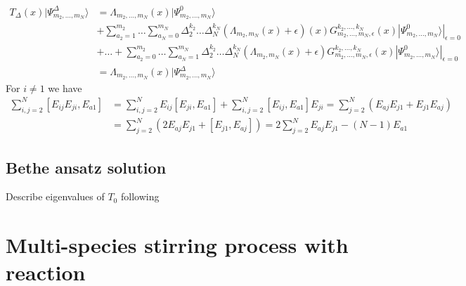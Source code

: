 \documentclass[11pt]{article}
\numberwithin{equation}{section}
\numberwithin{equation}{subsection}
\begin{document}
{\begin{align*}
T_{\Delta}(x)|\Psi_{m_{2},\ldots,m_{N}}^{\Delta}\rangle&=
		\Lambda_{m_{2},\ldots,m_{N}}(x)|\Psi_{m_{2},\ldots,m_{N}}^{0}\rangle
	\\&+
	\sum_{a_{2}=1}^{m_{2}}\ldots\sum_{a_{N}=0}^{m_{N}}\Delta_{2}^{k_{2}}\ldots \Delta_{N}^{k_{N}}\left(\Lambda_{m_{2},m_{N}}(x)+\epsilon\right)(x)G_{m_{2},\ldots,m_{N},\epsilon}^{k_{2},\ldots,k_{N}}(x)|\Psi_{m_{2},\ldots,m_{N}}^{0}\rangle|_{\epsilon=0}
	\\&+\ldots+	\sum_{a_{2}=0}^{m_{2}}\ldots\sum_{a_{N}=1}^{m_{N}}\Delta_{2}^{k_{2}}\ldots \Delta_{N}^{k_{N}}\left(\Lambda_{m_{2},m_{N}}(x)+\epsilon\right)G_{m_{2},\ldots,m_{N},\epsilon}^{k_{2},\ldots,k_{N}}(x)|\Psi_{m_{2},\ldots,m_{N}}^{0}\rangle|_{\epsilon=0}
	\\&=
	\Lambda_{m_{2},\ldots,m_{N}}(x)|\Psi_{m_{2},\ldots,m_{N}}^{\Delta}\rangle
\end{align*}
}
For $i\neq 1$ we have
\begin{equation}
\begin{split}
 \sum_{i,j=2}^N [E_{ij}E_{ji},E_{a1}]&=\sum_{i,j=2}^N E_{ij} [E_{ji},E_{a1}]+\sum_{i,j=2}^N  [E_{ij},E_{a1}]E_{ji}=\sum_{j=2}^N( E_{aj} E_{j1}+ E_{j1} E_{aj})
\\&=\sum_{j=2}^N( 2E_{aj} E_{j1}+ [E_{j1}, E_{aj}])=2\sum_{j=2}^N E_{aj} E_{j1}-(N-1)E_{a1}
 \end{split}
\end{equation} 

\subsection{Bethe ansatz solution}

Describe eigenvalues of $T_0$ following 
\cite{Belliard2} 


\section{Multi-species stirring process with reaction}
\end{document}
